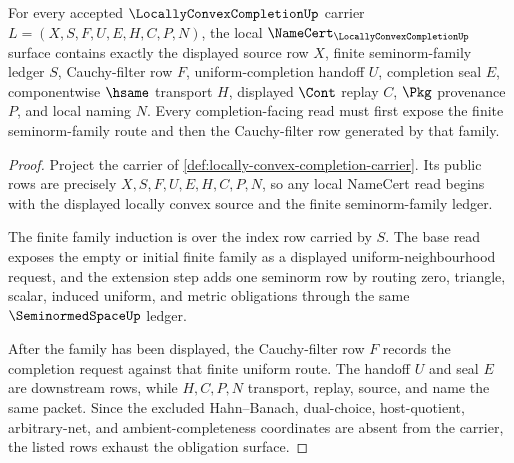 \begin{theorem}
\label{thm:locally-convex-completion-seminorm-filter-obligations}
For every accepted $\LocallyConvexCompletionUp$ carrier $L=(X,S,F,U,E,H,C,P,N)$, the local $\NameCert_{\LocallyConvexCompletionUp}$ surface contains exactly the displayed source row $X$, finite seminorm-family ledger $S$, Cauchy-filter row $F$, uniform-completion handoff $U$, completion seal $E$, componentwise $\hsame$ transport $H$, displayed $\Cont$ replay $C$, $\Pkg$ provenance $P$, and local naming $N$. Every completion-facing read must first expose the finite seminorm-family route and then the Cauchy-filter row generated by that family.
\end{theorem}
\begin{proof}
Project the carrier of \autoref{def:locally-convex-completion-carrier}. Its public rows are precisely $X,S,F,U,E,H,C,P,N$, so any local NameCert read begins with the displayed locally convex source and the finite seminorm-family ledger.

The finite family induction is over the index row carried by $S$. The base read exposes the empty or initial finite family as a displayed uniform-neighbourhood request, and the extension step adds one seminorm row by routing zero, triangle, scalar, induced uniform, and metric obligations through the same $\SeminormedSpaceUp$ ledger.

After the family has been displayed, the Cauchy-filter row $F$ records the completion request against that finite uniform route. The handoff $U$ and seal $E$ are downstream rows, while $H,C,P,N$ transport, replay, source, and name the same packet. Since the excluded Hahn--Banach, dual-choice, host-quotient, arbitrary-net, and ambient-completeness coordinates are absent from the carrier, the listed rows exhaust the obligation surface.
\end{proof}


